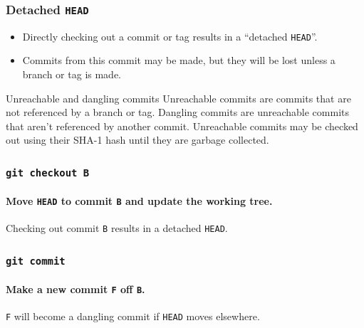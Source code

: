 \documentclass{beamer}
\newcommand\gitcmd[1]{\texttt{git #1}}
\newcommand\grefspec[1]{\texttt{#1}}
\newcommand\gHEAD{\texttt{HEAD}}
\begin{document}
\begin{frame}
  \frametitle{Detached \gHEAD{}}

  \begin{itemize}
    \item Directly checking out a commit or tag results in a ``detached \gHEAD{}''.
    \item Commits from this commit may be made, but they will be lost unless a branch or tag is made.
  \end{itemize}
  \vfill
  \begin{block}{Unreachable and dangling commits}
    Unreachable commits are commits that are not referenced by a branch or tag. Dangling commits are unreachable commits that aren't referenced by another commit. Unreachable commits may be checked out using their SHA-1 hash until they are garbage collected.
  \end{block}
\end{frame}

\begin{frame}
  \frametitle{\gitcmd{checkout B}}
  \framesubtitle{Move \gHEAD{} to commit \grefspec{B} and update the working tree.}
  \begin{figure}
    \centering
  \end{figure}

  Checking out commit \grefspec{B} results in a detached \gHEAD{}.
\end{frame}

\begin{frame}
  \frametitle{\gitcmd{commit}}
  \framesubtitle{Make a new commit \grefspec{F} off \grefspec{B}.}
  \begin{figure}
    \centering
  \end{figure}

  \grefspec{F} will become a dangling commit if \grefspec{HEAD} moves elsewhere.
\end{frame}
\end{document}
